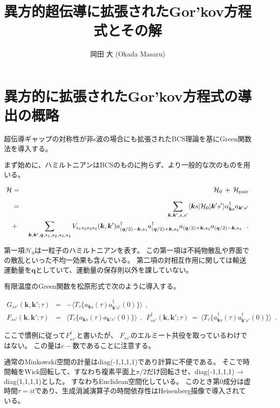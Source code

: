 \documentclass[uplatex,a4j,12pt,dvipdfmx]{jsarticle}
\title{
異方的超伝導に拡張されたGor'kov方程式とその解
}
\author{
岡田 大 (Okada Masaru)
}
\begin{document}
\maketitle

\section{異方的に拡張されたGor'kov方程式の導出の概略}

超伝導ギャップの対称性が非s波の場合にも拡張されたBCS理論を基にGreen関数法を導入する。

まず始めに、ハミルトニアンはBCSのものに拘らず、より一般的な次のものを用いる。

\begin{eqnarray}
	\mathcal{H}
	&=&
	\mathcal{H}_{0} \ \! + \ \! \mathcal{H}_{\rm pair}
	\nonumber \\[2mm] &=&
	\sum_{\bm{k},\bm{k}',s,s'}
	\langle \bm{k} s | \mathcal{H}_{0} | \bm{k}' s' \rangle
	a_{\bm{k} s}^{\dagger}
	a_{\bm{k}' s'}
	\nonumber \\ \ &+& \
	\sum_{\bm{k},\bm{k}',\bm{q},s_{1},s_{2},s_{3},s_{4}}
	V_{s_{1}s_{2}s_{3}s_{4}}(\bm{k},\bm{k}')
	a_{(\bm{q}/2) - \bm{k} , s_{1}}^{\dagger}
	a_{(\bm{q}/2) + \bm{k} , s_{2}}^{\dagger}
	a_{(\bm{q}/2) + \bm{k} , s_{3}}
	a_{(\bm{q}/2) - \bm{k} , s_{4}}
	\ \ .
\end{eqnarray}

第一項$\mathcal{H}_{0}$は一粒子のハミルトニアンを表す。
この第一項は不純物散乱や界面での散乱といった不均一効果も含んでいる。
第二項の対相互作用に関しては輸送運動量を$\bm{q}$としていて、運動量の保存則以外を課していない。

有限温度のGreen関数を松原形式で次のように導入する。

\begin{eqnarray}
	G_{ss'}(\bm{k} , \bm{k}' ; \tau)
	&=&
	-
	\langle T_{\tau} \{ a_{\bm{k}s}(\tau) a_{\bm{k}'s'}^{\dagger}(0) \} \rangle
	\ \ ,
	\\[3mm]
	F_{ss'}(\bm{k} , \bm{k}' ; \tau)
	&=&
	\langle T_{\tau} \{ a_{\bm{k}s}(\tau) a_{\bm{k}'s'}(0) \} \rangle
	\ \ , \ \
	F_{ss'}^{\dagger}(\bm{k} , \bm{k}' ; \tau)
	\ = \
	\langle T_{\tau} \{ a_{\bm{k}s}^{\dagger}(\tau) a_{\bm{k}'s'}^{\dagger}(0) \} \rangle
	\ \ .
\end{eqnarray}

ここで慣例に従って$F_{ss'}^{\dagger}$と書いたが、
$F_{ss'}$のエルミート共役を取っているわけではない。
この量は$c-$数であることに注意する。

通常のMinkowski空間の計量はdiag(-1,1,1,1)であり計算に不便である。
そこで時間軸をWick回転して、すなわち複素平面上$\pi/2$だけ回転させ、diag(-1,1,1,1)$\to$diag(1,1,1,1)とした。
すなわちEuclidean空間化している。
このとき第0成分は虚時間$\tau=i t$であり、生成消滅演算子の時間依存性はHeisenberg描像で導入されている。
\end{document}
